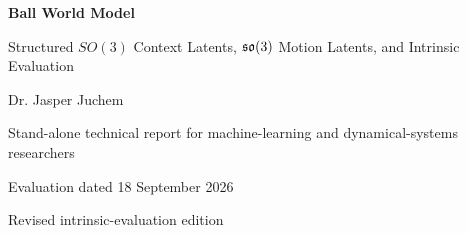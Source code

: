 \documentclass[11pt,a4paper]{article}
\begin{document}
\begin{titlepage}\centering\vspace*{24mm}
{\Huge\bfseries\color{reportblue} Ball World Model\par}\vspace{5mm}
{\LARGE Structured $SO(3)$ Context Latents, $\mathfrak{so}(3)$ Motion Latents, and Intrinsic Evaluation\par}\vspace{15mm}
\vfill{\Large Dr. Jasper Juchem\par}\vspace{4mm}
{\large Stand-alone technical report for machine-learning and dynamical-systems researchers\par}\vspace{10mm}
{\large Evaluation dated 18 September 2026\par}{\large Revised intrinsic-evaluation edition\par}
\end{titlepage}
\end{document}
